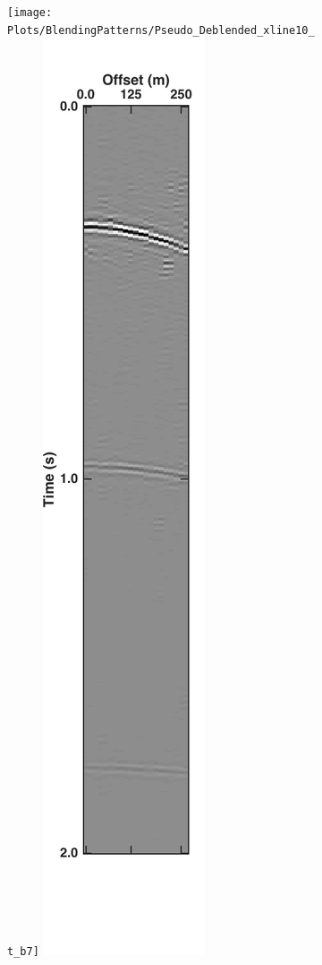 \begin{figure}
\begin{subfigure}[t]{0.26\textwidth}
		\caption{}
		\label{fig:Ch-Results-Debl-inline10-x}
	\end{subfigure}
	\centering
	\begin{subfigure}[t]{0.26\textwidth}
		\centering
		\texttt{[image: Plots/BlendingPatterns/Pseudo\_Deblended\_xline10\_t\_b7]}
		\includegraphics[height = 0.38\textheight]{Plots/BlendingPatterns/Deblended_xline10t}

\end{subfigure}
\end{figure}
